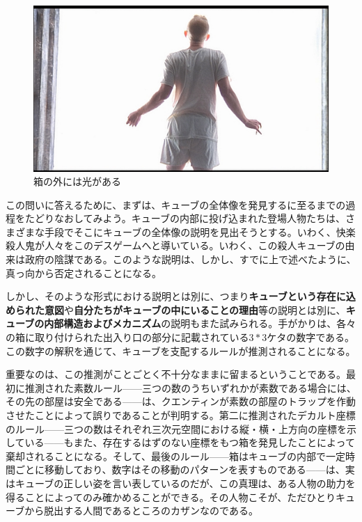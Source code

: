 \documentclass[a4paper]{jsarticle}
\begin{document}
\begin{figure}[h]
\centering
\includegraphics[scale=0.2]{光}
\caption{箱の外には光がある}
\end{figure}

この問いに答えるために、まずは、キューブの全体像を発見するに至るまでの過程をたどりなおしてみよう。キューブの内部に投げ込まれた登場人物たちは、さまざまな手段でそこにキューブの全体像の説明を見出そうとする。いわく、快楽殺人鬼が人々をこのデスゲームへと導いている。いわく、この殺人キューブの由来は政府の陰謀である。このような説明は、しかし、すでに上で述べたように、真っ向から否定されることになる。

しかし、そのような形式における説明とは別に、つまり\textbf{キューブという存在に込められた意図}や\textbf{自分たちがキューブの中にいることの理由}等の説明とは別に、\textbf{キューブの内部構造およびメカニズム}の説明もまた試みられる。手がかりは、各々の箱に取り付けられた出入り口の部分に記載されている$3*3$ケタの数字である。この数字の解釈を通じて、キューブを支配するルールが推測されることになる。

重要なのは、この推測がことごとく不十分なままに留まるということである。最初に推測された素数ルール------三つの数のうちいずれかが素数である場合には、その先の部屋は安全である------は、クエンティンが素数の部屋のトラップを作動させたことによって誤りであることが判明する。第二に推測されたデカルト座標のルール------三つの数はそれぞれ三次元空間における縦・横・上方向の座標を示している------もまた、存在するはずのない座標をもつ箱を発見したことによって棄却されることになる。そして、最後のルール------箱はキューブの内部で一定時間ごとに移動しており、数字はその移動のパターンを表すものである------は、実はキューブの正しい姿を言い表しているのだが、この真理は、ある人物の助力を得ることによってのみ確かめることができる。その人物こそが、ただひとりキューブから脱出する人間であるところのカザンなのである。
\end{document}
